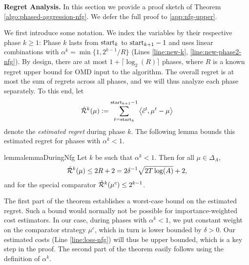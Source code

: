 \documentclass[11pt]{article}
\begin{document}
\textbf{Regret Analysis.} In this section we
provide a proof sketch of Theorem \ref{algo:phased-aggression-nfg}. We defer the full proof to \cref{app:nfg-upper}.

We first introduce some notation. We index the variables by their respective phase $k\geq 1$: Phase $k$ lasts from $\text{start}_k$ to $\text{start}_{k+1}-1$ and uses linear combinations with $\alpha^k = \min\{1,2^{k-1}/R\}$ (Lines \ref{line:new-k}, \ref{line:new-phase2-nfg}). By design, there are at most $1+\lceil\log_2(R)\rceil$ phases, where $R$ is a known regret upper bound for OMD input to the algorithm. The overall regret is at most the sum of regrets across all phases, and we will thus analyze each phase separately. To this end, let 
\begin{align*}
    \hat{\mathcal{R}}^k(\mu):= \sum_{t=\text{start}_k}^{\text{start}_{k+1}-1} \left\langle \hat{c}^t, \mu^t-\mu \right\rangle 
\end{align*}
denote the \emph{estimated regret} during phase $k$. The following lemma bounds this estimated regret for phases with $\alpha^k<1$. 
\begin{restatable}{lemma}{lemmaDuringNfg} \label{lemma:during-nfg}
    Let $k$ be such that $\alpha^k<1$. Then for all $\mu\in\Delta_A$,
    \begin{align*}
        \hat{\mathcal{R}}^k(\mu) \leq 2R+2= 2\delta^{-1} \sqrt{2T\log(A)}+2,
    \end{align*}
    and for the special comparator $\hat{\mathcal{R}}^k(\mu^c) \leq 2^{k-1}$.
\end{restatable}
\noindent The first part of the theorem establishes a worst-case bound on the estimated regret. Such a bound would normally not be possible for importance-weighted cost estimators. In our case, during phases with $\alpha^k<1$, we put constant weight on the comparator strategy $\mu^c$, which in turn is lower bounded by $\delta>0$. Our estimated costs (Line \ref{line:loss-nfg}) will thus be upper bounded, which is a key step in the proof. The second part of the theorem easily follows using the definition of $\alpha^k$.
\end{document}
